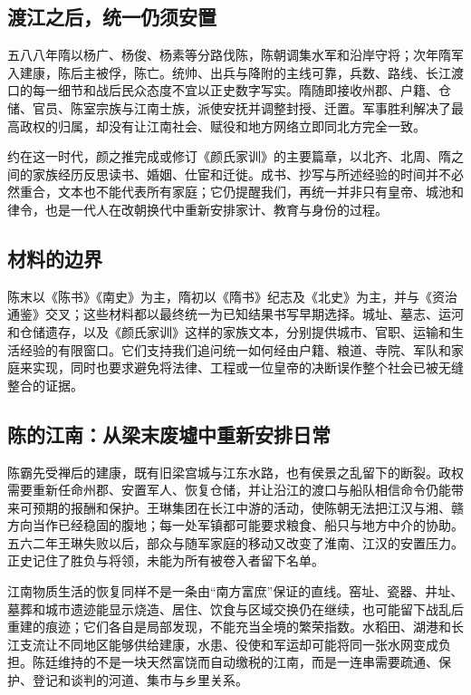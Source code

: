 \subsection{渡江之后，统一仍须安置}

五八八年隋以杨广、杨俊、杨素等分路伐陈，陈朝调集水军和沿岸守将；\hypertarget{evt:NSL-440-589-290}{\textcolor{dynasty}{次年隋军入建康，陈后主被俘，陈亡}}。统帅、出兵与降附的主线可靠，兵数、路线、长江渡口的每一细节和战后民众态度不宜以正史数字写实。隋随即接收州郡、户籍、仓储、官员、陈室宗族与江南士族，派使安抚并调整封授、迁置。军事胜利解决了最高政权的归属，却没有让江南社会、赋役和地方网络立即同北方完全一致。

约在这一时代，颜之推完成或修订《颜氏家训》的主要篇章，以北齐、北周、隋之间的家族经历反思读书、婚姻、仕宦和迁徙。成书、抄写与所述经验的时间并不必然重合，文本也不能代表所有家庭；它仍提醒我们，再统一并非只有皇帝、城池和律令，也是一代人在改朝换代中重新安排家计、教育与身份的过程。

\subsection{材料的边界}

陈末以《陈书》《南史》为主，隋初以《隋书》纪志及《北史》为主，并与《资治通鉴》交叉；这些材料都以最终统一为已知结果书写早期选择。城址、墓志、运河和仓储遗存，以及《颜氏家训》这样的家族文本，分别提供城市、官职、运输和生活经验的有限窗口。它们支持我们追问统一如何经由户籍、粮道、寺院、军队和家庭来实现，同时也要求避免将法律、工程或一位皇帝的决断误作整个社会已被无缝整合的证据。

\subsection{陈的江南：从梁末废墟中重新安排日常}

陈霸先受禅后的建康，既有旧梁宫城与江东水路，也有侯景之乱留下的断裂。政权需要重新任命州郡、安置军人、恢复仓储，并让沿江的渡口与船队相信命令仍能带来可预期的报酬和保护。王琳集团在长江中游的活动，使陈朝无法把江汉与湘、赣方向当作已经稳固的腹地；每一处军镇都可能要求粮食、船只与地方中介的协助。五六二年王琳失败以后，部众与随军家庭的移动又改变了淮南、江汉的安置压力。正史记住了胜负与将领，未能为所有被卷入者留下名单。

江南物质生活的恢复同样不是一条由“南方富庶”保证的直线。窑址、瓷器、井址、墓葬和城市遗迹能显示烧造、居住、饮食与区域交换仍在继续，也可能留下战乱后重建的痕迹；它们各自是局部发现，不能充当全境的繁荣指数。水稻田、湖港和长江支流让不同地区能够供给建康，水患、役使和军运却可能将同一张水网变成负担。陈廷维持的不是一块天然富饶而自动缴税的江南，而是一连串需要疏通、保护、登记和谈判的河道、集市与乡里关系。

